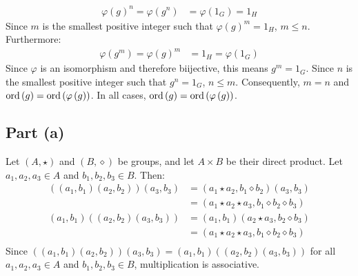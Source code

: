 \documentclass{article}
\begin{document}
\begin{equation}
    \begin{split}
        \varphi\left(g\right)^n = \varphi\left(g^n\right) & = \varphi\left(1_G\right) = 1_H
    \end{split}
\end{equation}
Since $m$ is the smallest positive integer such that $\varphi\left(g\right)^m = 1_H$, $m \leq n$. Furthermore:
\begin{equation}
    \begin{split}
        \varphi\left(g^m\right) = \varphi\left(g\right)^m & = 1_H = \varphi\left(1_G\right)
    \end{split}
\end{equation}
Since  $\varphi$ is an isomorphism and therefore biijective, this means $g^m = 1_G$. Since $n$ is the smallest positive integer such that $g^n = 1_G$, $n \leq m$. Consequently, $m = n$ and $\operatorname{ord}\left(g\right) = \operatorname{ord}\left(\varphi\left(g\right)\right)$. In all cases, $\operatorname{ord}\left(g\right) = \operatorname{ord}\left(\varphi\left(g\right)\right)$.

\newpage

\problem
\subsection*{Part (a)}
Let $\left(A,\star\right)$ and $\left(B, \diamond\right)$ be groups, and let $A\times B$ be their direct product. Let $a_1, a_2, a_3 \in A$ and $b_1, b_2, b_3 \in B$. Then:
\begin{equation}
    \begin{split}
        \left(\left(a_1,b_1\right)\left(a_2,b_2\right)\right)\left(a_3,b_3\right) & = \left(a_1 \star a_2, b_1 \diamond b_2\right)\left(a_3,b_3\right) \\
        & = \left(a_1 \star a_2  \star a_3, b_1 \diamond b_2 \diamond b_3\right) \\
        \left(a_1,b_1\right)\left(\left(a_2,b_2\right)\left(a_3,b_3\right)\right) & = \left(a_1, b_1\right)\left(a_2 \star a_3, b_2 \diamond b_3\right) \\
        & = \left(a_1 \star a_2  \star a_3, b_1 \diamond b_2 \diamond b_3\right) \\
    \end{split}
\end{equation}
Since $\left(\left(a_1,b_1\right)\left(a_2,b_2\right)\right)\left(a_3,b_3\right) = \left(a_1,b_1\right)\left(\left(a_2,b_2\right)\left(a_3,b_3\right)\right)$ for all $a_1, a_2, a_3 \in A$ and $b_1, b_2, b_3 \in B$, multiplication is associative.
\end{document}
